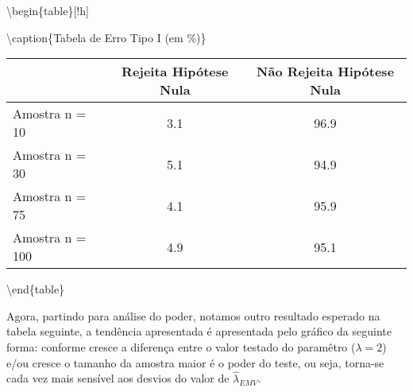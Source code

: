 \documentclass[11pt,]{article}
\begin{document}
\textbackslash{}begin\{table\}{[}!h{]}

\textbackslash{}caption\{\label{tab:unnamed-chunk-6}Tabela de Erro Tipo
I (em \%)\} \centering

\begin{tabular}[t]{lcc}
\toprule
  & Rejeita Hipótese Nula & Não Rejeita Hipótese Nula\\
\midrule
Amostra n = 10 & 3.1 & 96.9\\
Amostra n = 30 & 5.1 & 94.9\\
Amostra n = 75 & 4.1 & 95.9\\
Amostra n = 100 & 4.9 & 95.1\\
\bottomrule
\end{tabular}

\textbackslash{}end\{table\}

Agora, partindo para análise do poder, notamos outro resultado esperado
na tabela seguinte, a tendência apresentada é apresentada pelo gráfico
da seguinte forma: conforme cresce a diferença entre o valor testado do
paramêtro (\(\lambda = 2\)) e/ou cresce o tamanho da amostra maior é o
poder do teste, ou seja, torna-se cada vez mais sensível aos desvios do
valor de \(\hat{\lambda}_{EMV}\).
\end{document}
